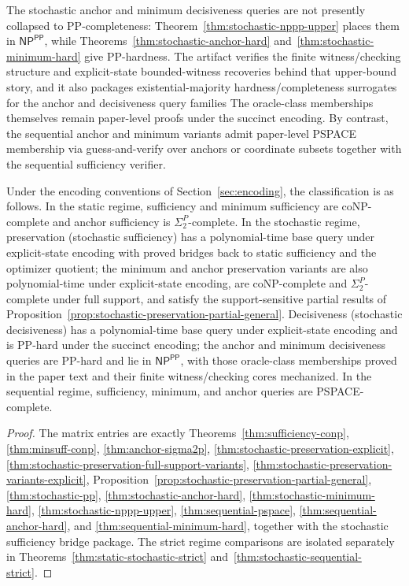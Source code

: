 The stochastic anchor and minimum decisiveness queries are not presently collapsed to PP-completeness: Theorem~\ref{thm:stochastic-nppp-upper} places them in $\textsf{NP}^{\textsf{PP}}$, while Theorems~\ref{thm:stochastic-anchor-hard} and~\ref{thm:stochastic-minimum-hard} give PP-hardness. The artifact verifies the finite witness/checking structure and explicit-state bounded-witness recoveries behind that upper-bound story, and it also packages existential-majority hardness/completeness surrogates for the anchor and decisiveness query families  The oracle-class memberships themselves remain paper-level proofs under the succinct encoding. By contrast, the sequential anchor and minimum variants admit paper-level PSPACE membership via guess-and-verify over anchors or coordinate subsets together with the sequential sufficiency verifier.

\begin{theorem}\label{thm:regime-main}
Under the encoding conventions of Section~\ref{sec:encoding}, the classification is as follows. In the static regime, sufficiency and minimum sufficiency are coNP-complete and anchor sufficiency is $\Sigma_2^P$-complete. In the stochastic regime, preservation (stochastic sufficiency) has a polynomial-time base query under explicit-state encoding with proved bridges back to static sufficiency and the optimizer quotient; the minimum and anchor preservation variants are also polynomial-time under explicit-state encoding, are coNP-complete and $\Sigma_2^P$-complete under full support, and satisfy the support-sensitive partial results of Proposition~\ref{prop:stochastic-preservation-partial-general}. Decisiveness (stochastic decisiveness) has a polynomial-time base query under explicit-state encoding and is PP-hard under the succinct encoding; the anchor and minimum decisiveness queries are PP-hard and lie in $\textsf{NP}^{\textsf{PP}}$, with those oracle-class memberships proved in the paper text and their finite witness/checking cores mechanized. In the sequential regime, sufficiency, minimum, and anchor queries are PSPACE-complete.
\end{theorem}


\begin{proof}
The matrix entries are exactly Theorems~\ref{thm:sufficiency-conp}, \ref{thm:minsuff-conp}, \ref{thm:anchor-sigma2p}, \ref{thm:stochastic-preservation-explicit}, \ref{thm:stochastic-preservation-full-support-variants}, \ref{thm:stochastic-preservation-variants-explicit}, Proposition~\ref{prop:stochastic-preservation-partial-general}, \ref{thm:stochastic-pp}, \ref{thm:stochastic-anchor-hard}, \ref{thm:stochastic-minimum-hard}, \ref{thm:stochastic-nppp-upper}, \ref{thm:sequential-pspace}, \ref{thm:sequential-anchor-hard}, and \ref{thm:sequential-minimum-hard}, together with the stochastic sufficiency bridge package. The strict regime comparisons are isolated separately in Theorems~\ref{thm:static-stochastic-strict} and~\ref{thm:stochastic-sequential-strict}.
\end{proof}

